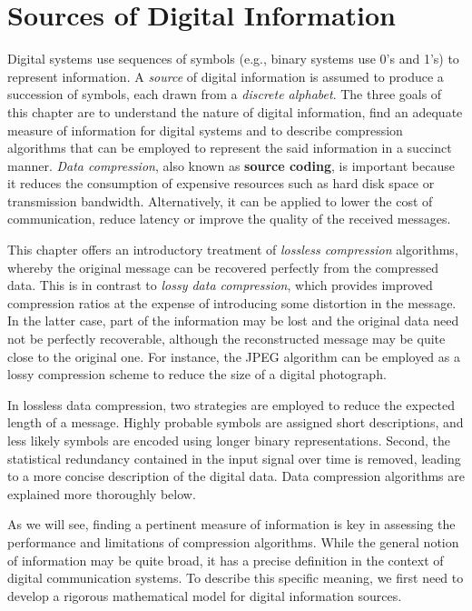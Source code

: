 \chapter{Sources of Digital Information}
\label{chapter:Sources}

Digital systems use sequences of symbols (e.g., binary systems use 0's and 1's) to represent information.
A \emph{source} of digital information is assumed to produce a succession of symbols, each drawn from a \emph{discrete alphabet}.
The three goals of this chapter are to understand the nature of digital information, find an adequate measure of information for digital systems and to describe compression algorithms that can be employed to represent the said information in a succinct manner.
\emph{Data compression}, also known as \textbf{source coding}, is important because it reduces the consumption of expensive resources such as hard disk space or transmission bandwidth.
Alternatively, it can be applied to lower the cost of communication, reduce latency or improve the quality of the received messages.

This chapter offers an introductory treatment of \emph{lossless compression} algorithms, whereby the original message can be recovered perfectly from the compressed data.
This is in contrast to \emph{lossy data compression}, which provides improved compression ratios at the expense of introducing some distortion in the message.
In the latter case, part of the information may be lost and the original data need not be perfectly recoverable, although the reconstructed message may be quite close to the original one.
For instance, the JPEG algorithm can be employed as a lossy compression scheme to reduce the size of a digital photograph.

In lossless data compression, two strategies are employed to reduce the expected length of a message.
Highly probable symbols are assigned short descriptions, and less likely symbols are encoded using longer binary representations.
Second, the statistical redundancy contained in the input signal over time is removed, leading to a more concise description of the digital data.
Data compression algorithms are explained more thoroughly below.

As we will see, finding a pertinent measure of information is key in assessing the performance and limitations of compression algorithms.
While the general notion of information may be quite broad, it has a precise definition in the context of digital communication systems.
To describe this specific meaning, we first need to develop a rigorous mathematical model for digital information sources.


